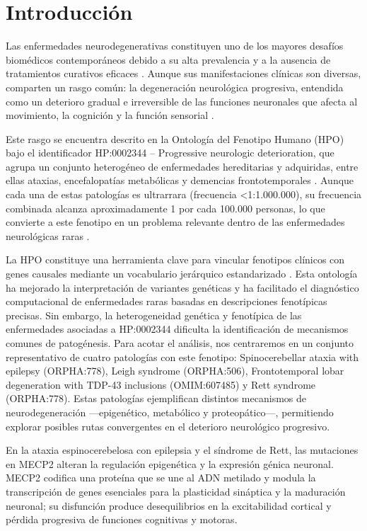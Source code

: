 
\section{Introducción}

Las enfermedades neurodegenerativas constituyen uno de los mayores desafíos biomédicos contemporáneos debido a su alta prevalencia y a la ausencia de tratamientos curativos eficaces \cite{ref1}. Aunque sus manifestaciones clínicas son diversas, comparten un rasgo común: la degeneración neurológica progresiva, entendida como un deterioro gradual e irreversible de las funciones neuronales que afecta al movimiento, la cognición y la función sensorial \cite{ref2}.

Este rasgo se encuentra descrito en la Ontología del Fenotipo Humano (HPO) bajo el identificador HP:0002344 – Progressive neurologic deterioration, que agrupa un conjunto heterogéneo de enfermedades hereditarias y adquiridas, entre ellas ataxias, encefalopatías metabólicas y demencias frontotemporales \cite{ref3}. Aunque cada una de estas patologías es ultrarrara (frecuencia <1:1.000.000), su frecuencia combinada alcanza aproximadamente 1 por cada 100.000 personas, lo que convierte a este fenotipo en un problema relevante dentro de las enfermedades neurológicas raras \cite{ref4}.

La HPO constituye una herramienta clave para vincular fenotipos clínicos con genes causales mediante un vocabulario jerárquico estandarizado \cite{ref5}. Esta ontología ha mejorado la interpretación de variantes genéticas y ha facilitado el diagnóstico computacional de enfermedades raras basadas en descripciones fenotípicas precisas. 
Sin embargo, la heterogeneidad genética y fenotípica de las enfermedades asociadas a HP:0002344 dificulta la identificación de mecanismos comunes de patogénesis. Para acotar el análisis, nos centraremos en un conjunto representativo de cuatro patologías con este fenotipo: Spinocerebellar ataxia with epilepsy (ORPHA:778), Leigh syndrome (ORPHA:506), Frontotemporal lobar degeneration with TDP-43 inclusions (OMIM:607485) y Rett syndrome (ORPHA:778). Estas patologías ejemplifican distintos mecanismos de neurodegeneración —epigenético, metabólico y proteopático—, permitiendo explorar posibles rutas convergentes en el deterioro neurológico progresivo.

En la ataxia espinocerebelosa con epilepsia y el síndrome de Rett, las mutaciones en MECP2 alteran la regulación epigenética y la expresión génica neuronal. MECP2 codifica una proteína que se une al ADN metilado y modula la transcripción de genes esenciales para la plasticidad sináptica y la maduración neuronal; su disfunción produce desequilibrios en la excitabilidad cortical y pérdida progresiva de funciones cognitivas y motoras.

